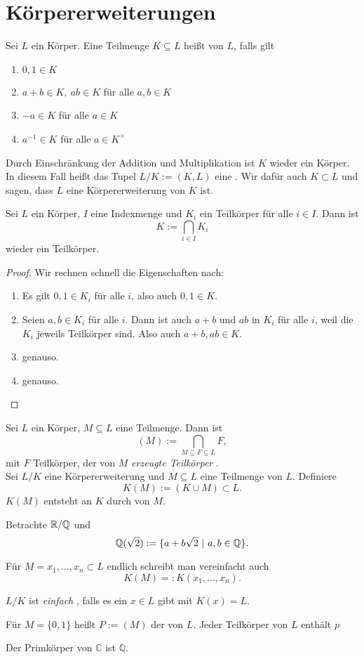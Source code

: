 \section{Körpererweiterungen}
\begin{defn}
	Sei $L$ ein Körper. Eine Teilmenge $K\subseteq L$ heißt  von $L$, falls gilt
	\begin{enumerate}
		\item $0,1\in K$
		\item $a+b\in K,~ab\in K$ für alle $a,b\in K$
		\item $-a\in K$ für alle $a\in K$
		\item $a^{-1}\in K$ für alle $a\in K^{\times}$
	\end{enumerate}
\end{defn}
Durch Einschränkung der Addition und Multiplikation ist $K$ wieder ein Körper. In diesem Fall heißt das Tupel $L/K:=(K,L)$ eine . Wir dafür auch $K\subset L$ und sagen, dass $L$ eine Körpererweiterung von $K$ ist.
\begin{lem}
	Sei $L$ ein Körper, $I$ eine Indexmenge und $K_i$ ein Teilkörper für alle $i\in I$. Dann ist
	\[
	K:= \bigcap_{i\in I} K_i
	\]
	wieder ein Teilkörper.
\end{lem}
\begin{proof}
	Wir rechnen schnell die Eigenschaften nach:
	\begin{enumerate}
		\item Es gilt $0,1\in K_i$ für alle $i$, also auch $0,1\in K$.
		\item Seien $a,b\in K_i$ für alle $i$. Dann ist auch $a+b$ und $ab$ in $K_i$ für alle $i$, weil die $K_i$ jeweils Teilkörper sind. Also auch $a+b,ab\in K$.
		\item genauso.
		\item genauso.
	\end{enumerate}
\end{proof}
\begin{defn}
	Sei $L$ ein Körper, $M\subseteq L$ eine Teilmenge. Dann ist
	\[
	(M):= \bigcap_{M\subseteq F\subseteq L} F,
	\]
	mit $F$ Teilkörper, der von $M$ \emph{erzeugte Teilkörper} . \\
	Sei $L/K$ eine Körpererweiterung und $M\subseteq L$ eine Teilmenge von $L$. Definiere
	\[
	K(M):= (K\cup M)\subset L.
	\]
	$K(M)$ entsteht an $K$ durch  von $M$.
\end{defn}
\begin{bsp}
	Betrachte $\mathbb{R}/\mathbb{Q}$ und
	\[
	\mathbb{Q}(\sqrt{2}) := \{ a+b\sqrt{2}~|~ a,b\in \mathbb{Q}\}.
	\]
\end{bsp}
Für $M = {x_1,...,x_n}\subset L$ endlich schreibt man vereinfacht auch
\[
K(M)=: K(x_1,...,x_n).
\]
\begin{defn}
	$L/K$ ist \emph{einfach} , falls es ein $x\in L$ gibt mit $K(x)=L$.
\end{defn}
\begin{defn}
	Für $M=\{0,1\}$ heißt $P:= (M)$ der  von $L$. Jeder Teilkörper von $L$ enthält $p$
\end{defn}
\begin{bsp}
	Der Primkörper von $\mathbb{C}$ ist $\mathbb{Q}$.
\end{bsp}
